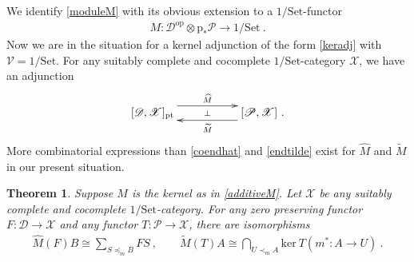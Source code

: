 \documentclass[a4paper,12pt,reqno]{amsart}
\newtheorem{theorem}{Theorem}[section] %
\theoremstyle{definition}
\theoremstyle{fact}
\theoremstyle{genquest}
\theoremstyle{step}
\newcommand{\dd}{\colon}
\newcommand{\lra}{\longrightarrow}
\newcommand{\ra}{\rightarrow}
\def\CD{{\mathscr D}}
\def\CP{{\mathscr P}}
\def\CV{{\mathscr V}}
\def\CX{{\mathscr X}}
\begin{document}
We identify \eqref{moduleM}
with its obvious extension to a $1/\mathrm{Set}$-functor
\begin{eqnarray}\label{additiveM}
M \dd \CD^{\mathrm{op}} \otimes \mathrm{p}_{*}\CP \lra 1/\mathrm{Set} \ .
\end{eqnarray}
Now we are in the situation for a kernel adjunction of the form \eqref{keradj} with 
$\CV = 1/\mathrm{Set}$. For any suitably complete and cocomplete 
$1/\mathrm{Set}$-category $\CX$, we have an adjunction
\begin{equation}\label{settingkeradj} 
\xymatrix @R-3mm {
[\CD,\CX]_{\mathrm{pt}} \ar@<1.5ex>[rr]^{\widehat{M}} \ar@{}[rr]|-{\bot} && [\CP,\CX]
 \ar@<1.5ex>[ll]^{\widetilde{M}} \ .
}
\end{equation}
More combinatorial expressions than \eqref{coendhat} and \eqref{endtilde} exist for $\widehat{M}$ and $\widetilde{M}$ in our present situation.
\begin{theorem}\label{combadj}
Suppose $M$ is the kernel as in \eqref{additiveM}.
Let $\CX$ be any suitably complete and cocomplete 
$1/\mathrm{Set}$-category. 
For any zero preserving functor $F\dd \CD\ra \CX$ and any functor 
$T\dd \CP \ra\CX$, there are isomorphisms
\begin{eqnarray*}
\widehat{M}(F)B \cong \sum_{S\preceq_m B}{FS} \ ,
\qquad
\widetilde{M}(T)A \cong \bigcap_{U\prec_m A} {\mathrm{ker} \ {T(m^*\dd A\ra U)}} \ .
\end{eqnarray*}
\end{theorem}
\end{document}
